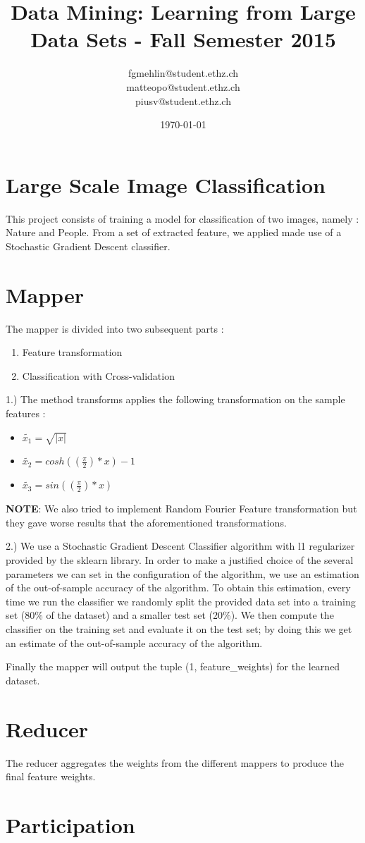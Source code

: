\documentclass[a4paper, 11pt]{article}
\title{Data Mining: Learning from Large Data Sets - Fall Semester 2015}
\author{fgmehlin@student.ethz.ch\\ matteopo@student.ethz.ch\\ piusv@student.ethz.ch\\}
\date{\today}
\begin{document}
\maketitle

\section*{Large Scale Image Classification} 
This project consists of training a model for classification of two images, namely : Nature and People. From a set of extracted feature, we applied made use of a Stochastic Gradient Descent classifier.
\section{Mapper}

The mapper is divided into two subsequent parts :
\begin{enumerate}
\item Feature transformation
\item Classification with Cross-validation
\end{enumerate}

1.) The method transforms applies the following transformation on the sample features :
\begin{itemize}
\item $\widetilde{x_1} = \sqrt{|x|}$
\item $\widetilde{x_2} = cosh((\frac{\pi}{2})*x) - 1$
\item $\widetilde{x_3} = sin((\frac{\pi}{2})*x)$
\end{itemize}

\textbf{NOTE}: We also tried to implement Random Fourier Feature transformation but they gave worse results that the aforementioned transformations.

2.) We use a Stochastic Gradient Descent Classifier algorithm with l1 regularizer provided by the sklearn library. In order to make a justified choice of the several parameters we can set in the configuration of the algorithm, we use an estimation of the out-of-sample accuracy of the algorithm. To obtain this estimation, every time we run the classifier we randomly split the provided data set into a training set (80\% of the dataset) and a smaller test set (20\%). We then compute the classifier on the training set and evaluate it on the test set; by doing this we get an estimate of the out-of-sample accuracy of the algorithm.

Finally the mapper will output the tuple (1, feature\_weights) for the learned dataset.

\section{Reducer}

The reducer aggregates the weights from the different mappers to produce the final feature weights.

\section{Participation}
\end{document}
